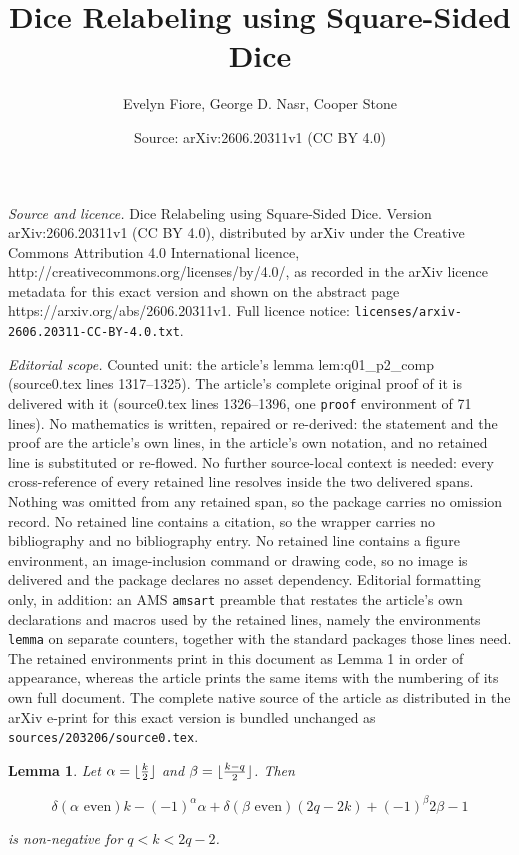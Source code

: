 \documentclass[10pt,a4paper]{amsart}
\title{Dice Relabeling using Square-Sided Dice}
\author{Evelyn Fiore, George D. Nasr, Cooper Stone}
\date{Source: arXiv:2606.20311v1 (CC BY 4.0)}
\newtheorem{lemma}{Lemma}
\begin{document}
\maketitle

\noindent\emph{Source and licence.} Dice Relabeling using Square-Sided Dice. Version arXiv:2606.20311v1 (CC BY 4.0), distributed by arXiv under the Creative Commons Attribution 4.0 International licence, http://creativecommons.org/licenses/by/4.0/, as recorded in the arXiv licence metadata for this exact version and shown on the abstract page https://arxiv.org/abs/2606.20311v1. Full licence notice: \texttt{licenses/arxiv-2606.20311-CC-BY-4.0.txt}.\par\smallskip

\noindent\textit{Editorial scope.} Counted unit: the article's lemma lem:q01\_p2\_comp (source0.tex lines 1317--1325). The article's complete original proof of it is delivered with it (source0.tex lines 1326--1396, one \texttt{proof} environment of 71 lines). No mathematics is written, repaired or re-derived: the statement and the proof are the article's own lines, in the article's own notation, and no retained line is substituted or re-flowed.  No further source-local context is needed: every cross-reference of every retained line resolves inside the two delivered spans.  Nothing was omitted from any retained span, so the package carries no omission record.  No retained line contains a citation, so the wrapper carries no bibliography and no bibliography entry.  No retained line contains a figure environment, an image-inclusion command or drawing code, so no image is delivered and the package declares no asset dependency.  Editorial formatting only, in addition: an AMS \texttt{amsart} preamble that restates the article's own declarations and macros used by the retained lines, namely the environments \texttt{lemma} on separate counters, together with the standard packages those lines need.  The retained environments print in this document as Lemma 1 in order of appearance, whereas the article prints the same items with the numbering of its own full document.  The complete native source of the article as distributed in the arXiv e-print for this exact version is bundled unchanged as \texttt{sources/203206/source0.tex}.
\begin{lemma}\label{lem:q01_p2_comp}
Let $\alpha=\lfloor {k\over 2}\rfloor$ and $\beta=\lfloor{k-q\over 2}\rfloor$. Then 

\begin{equation}\label{eq:floorsnonneg}
\delta(\alpha \text{ even}) k -(-1)^{\alpha}\alpha +\delta(\beta \text{ even})(2q-2k)+(-1)^\beta 2\beta -1
\end{equation}

is non-negative for $q<k<2q-2$.
\end{lemma}
\end{document}
